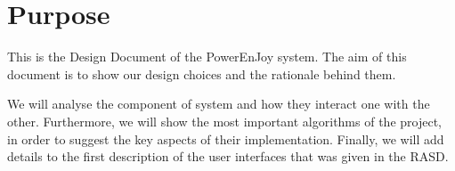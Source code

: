 \section{Purpose}
This is the Design Document of the PowerEnJoy system. The aim of this
document is to show our design choices and the rationale behind them. 

We will analyse the component of system and how they interact one with the other.
Furthermore, we will show the most important algorithms of the project, in order to suggest the key aspects of their implementation.
Finally, we will add details to the first description of the user interfaces that was given in the RASD.
